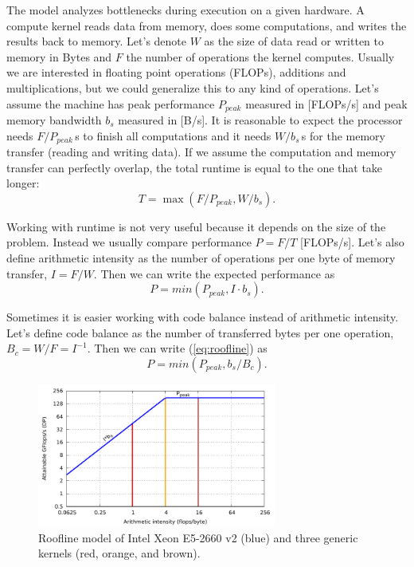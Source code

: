
The model analyzes bottlenecks during execution on a given hardware.
A compute kernel reads data from memory, does some computations, and writes the results back to memory. Let's denote $W$ as the size of data read or written to memory in Bytes and $F$ the number of operations the kernel computes. Usually we are interested in floating point operations (FLOPs), additions and multiplications, but we could generalize this to any kind of operations.
Let's assume the machine has peak performance $P_{peak}$ measured in [FLOPs/s] and peak memory bandwidth $b_s$ measured in [B/s].
It is reasonable to expect the processor needs $F/P_{peak}$\,s to finish all computations and it needs $W/b_s$\,s for the memory transfer (reading and writing data). If we assume the computation and memory transfer can perfectly overlap, the total runtime is equal to the one that take longer:
\begin{equation}
    T = \max(F/P_{peak}, W/b_s).
\end{equation}

Working with runtime is not very useful because it depends on the size of the problem. Instead we usually compare performance $P=F/T$ [FLOPs/s].
Let's also define arithmetic intensity as the number of operations per one byte of memory transfer, $I=F/W$. Then we can write the expected performance as
\begin{equation}
   P = min(P_{peak}, I \cdot b_s). \label{eq:roofline}
\end{equation}

Sometimes it is easier working with code balance instead of arithmetic intensity. Let's define code balance as the number of transferred bytes per one operation, $B_c=W/F=I^{-1}$. Then we can write (\ref{eq:roofline}) as
\begin{equation}
   P = min(P_{peak}, b_s/B_c). \label{eq:roofline_balance}
\end{equation}

\begin{figure}[t]
   \centering
   \includegraphics[width=0.7\textwidth,clip=true]{images/roofline/roofline_emmy_Xeon2660v2_naive.pdf}
   \caption{Roofline model of Intel Xeon E5-2660 v2 (blue) and three generic kernels (red, orange, and brown).}
  \label{fig:roofline_emmy_naive}
\end{figure}

